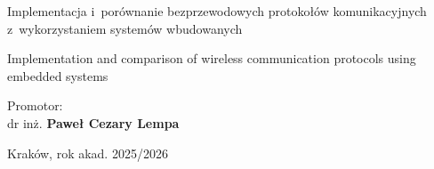 \begin{titlepage}
\begin{center}
        Implementacja i~porównanie bezprzewodowych protokołów komunikacyjnych z~wykorzystaniem systemów wbudowanych \\
        \vspace{0.3cm}

        Implementation and comparison of wireless communication protocols using embedded systems

    \end{center}

    \vspace{2cm}

    \begin{center}
        \large Promotor: \\ dr inż. \textbf{Paweł Cezary Lempa}
    \end{center}

    \vspace{1cm}

    \begin{center}
        \Large Kraków, rok akad. 2025/2026
    \end{center}
\end{titlepage}

\thispagestyle{empty}
\null
\newpage
